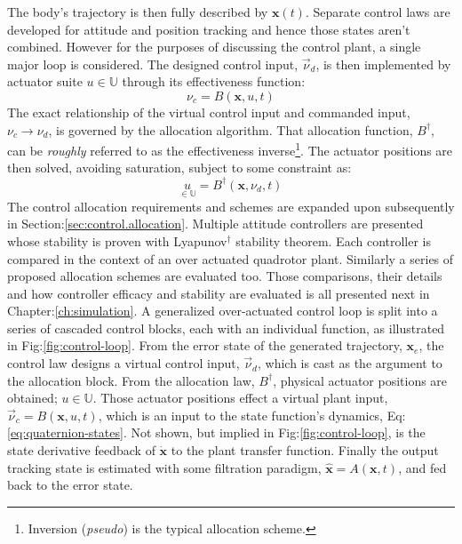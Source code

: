 The body's trajectory is then fully described by $\mathbf{x}(t)$. Separate control laws are developed for attitude and position tracking and hence those states aren't combined. However for the purposes of discussing the control plant, a single major loop is considered. The designed control input, $\vec{\nu}_d$, is then implemented by actuator suite $u\in\mathbb{U}$ through its effectiveness function:
\\
\vspace{-5pt}
\begin{equation}
\nu_c=B(\mathbf{x},u,t)
\end{equation}
The exact relationship of the virtual control input and commanded input, $\nu_c\rightarrow\nu_d$, is governed by the allocation algorithm. That allocation function, $B^\dagger$, can be \emph{roughly} referred to as the effectiveness inverse\footnote{Inversion (\emph{pseudo}) is the typical allocation scheme.}. The actuator positions are then solved, avoiding saturation, subject to some constraint as:
\begin{equation}
\underset{\in\mathbb{U}}{u}=B^{\dagger}(\mathbf{x},\nu_d,t)
\end{equation}
The control allocation requirements and schemes are expanded upon subsequently in Section:\ref{sec:control.allocation}. Multiple attitude controllers are presented whose stability is proven with Lyapunov$^\dagger$ stability theorem. Each controller is compared in the context of an over actuated quadrotor plant. Similarly a series of proposed allocation schemes are evaluated too. Those comparisons, their details and how controller efficacy and stability are evaluated is all presented next in Chapter:\ref{ch:simulation}. 
\newpage
A generalized over-actuated control loop is split into a series of cascaded control blocks, each with an individual function, as illustrated in Fig:\ref{fig:control-loop}. From the error state of the generated trajectory, $\mathbf{x}_e$, the control law designs a virtual control input, $\vec{\nu}_d$, which is cast as the argument to the allocation block. From the allocation law, $B^{\dagger}$, physical actuator positions are obtained; $u\in\mathbb{U}$. Those actuator positions effect a virtual plant input, $\vec{\nu}_c=B(\mathbf{x},u,t)$, which is an input to the state function's dynamics, Eq:\ref{eq:quaternion-states}. Not shown, but implied in Fig:\ref{fig:control-loop}, is the state derivative feedback of $\dot{\mathbf{x}}$ to the plant transfer function. Finally the output tracking state is estimated with some filtration paradigm, $\hat{\mathbf{x}}=A(\mathbf{x},t)$, and fed back to the error state.

